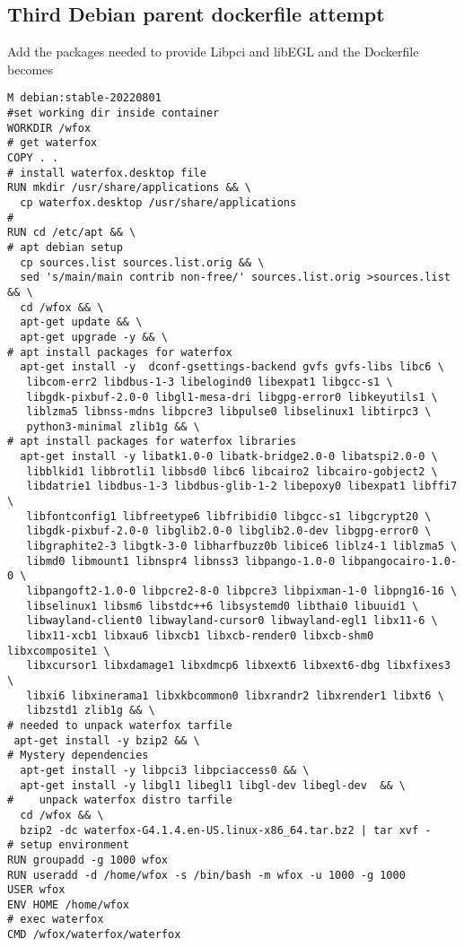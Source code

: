 \documentclass[a4paper]{article}  %
\begin{document}
\subsection{Third Debian parent dockerfile attempt}
 Add the packages needed to provide Libpci and libEGL and the Dockerfile becomes
\begin{tcolorbox}
\begin{verbatim}
M debian:stable-20220801
#set working dir inside container
WORKDIR /wfox
# get waterfox
COPY . .
# install waterfox.desktop file
RUN mkdir /usr/share/applications && \
  cp waterfox.desktop /usr/share/applications
#
RUN cd /etc/apt && \
# apt debian setup
  cp sources.list sources.list.orig && \
  sed 's/main/main contrib non-free/' sources.list.orig >sources.list && \
  cd /wfox && \
  apt-get update && \
  apt-get upgrade -y && \
# apt install packages for waterfox
  apt-get install -y  dconf-gsettings-backend gvfs gvfs-libs libc6 \
   libcom-err2 libdbus-1-3 libelogind0 libexpat1 libgcc-s1 \
   libgdk-pixbuf-2.0-0 libgl1-mesa-dri libgpg-error0 libkeyutils1 \
   liblzma5 libnss-mdns libpcre3 libpulse0 libselinux1 libtirpc3 \
   python3-minimal zlib1g && \
# apt install packages for waterfox libraries
  apt-get install -y libatk1.0-0 libatk-bridge2.0-0 libatspi2.0-0 \
   libblkid1 libbrotli1 libbsd0 libc6 libcairo2 libcairo-gobject2 \
   libdatrie1 libdbus-1-3 libdbus-glib-1-2 libepoxy0 libexpat1 libffi7 \
   libfontconfig1 libfreetype6 libfribidi0 libgcc-s1 libgcrypt20 \
   libgdk-pixbuf-2.0-0 libglib2.0-0 libglib2.0-dev libgpg-error0 \
   libgraphite2-3 libgtk-3-0 libharfbuzz0b libice6 liblz4-1 liblzma5 \
   libmd0 libmount1 libnspr4 libnss3 libpango-1.0-0 libpangocairo-1.0-0 \
   libpangoft2-1.0-0 libpcre2-8-0 libpcre3 libpixman-1-0 libpng16-16 \
   libselinux1 libsm6 libstdc++6 libsystemd0 libthai0 libuuid1 \
   libwayland-client0 libwayland-cursor0 libwayland-egl1 libx11-6 \
   libx11-xcb1 libxau6 libxcb1 libxcb-render0 libxcb-shm0 libxcomposite1 \
   libxcursor1 libxdamage1 libxdmcp6 libxext6 libxext6-dbg libxfixes3 \
   libxi6 libxinerama1 libxkbcommon0 libxrandr2 libxrender1 libxt6 \
   libzstd1 zlib1g && \
# needed to unpack waterfox tarfile
 apt-get install -y bzip2 && \
# Mystery dependencies
  apt-get install -y libpci3 libpciaccess0 && \
  apt-get install -y libgl1 libegl1 libgl-dev libegl-dev  && \
#    unpack waterfox distro tarfile
  cd /wfox && \
  bzip2 -dc waterfox-G4.1.4.en-US.linux-x86_64.tar.bz2 | tar xvf -
# setup environment
RUN groupadd -g 1000 wfox
RUN useradd -d /home/wfox -s /bin/bash -m wfox -u 1000 -g 1000
USER wfox
ENV HOME /home/wfox
# exec waterfox
CMD /wfox/waterfox/waterfox
\end{verbatim}
\end{tcolorbox}
\end{document}
